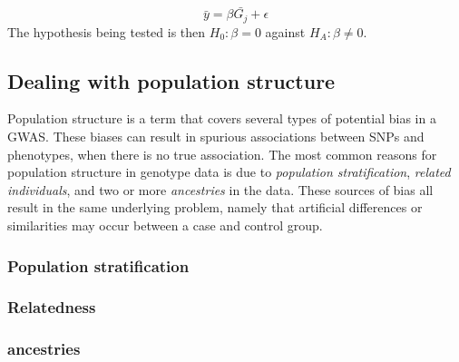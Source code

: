 \begin{equation}\label{eq:univarGWAS}
\bar{y} = \beta \bar{G_j} + \epsilon
\end{equation}
The hypothesis being tested is then $ H_0: \beta = 0 $ against $ H_A: \beta \neq 0 $. 

\subsection{Dealing with population structure}
Population structure is a term that covers several types of potential bias in a GWAS. These biases can result in spurious associations between SNPs and phenotypes, when there is no true association. The most common reasons for population structure in genotype data is due to \textit{population stratification}, \textit{related individuals}, and two or more \textit{ancestries} in the data. These sources of bias all result in the same underlying problem, namely that artificial differences or similarities may occur between a case and control group. 

\subsubsection{Population stratification}


\subsubsection{Relatedness}


\subsubsection{ancestries}   

